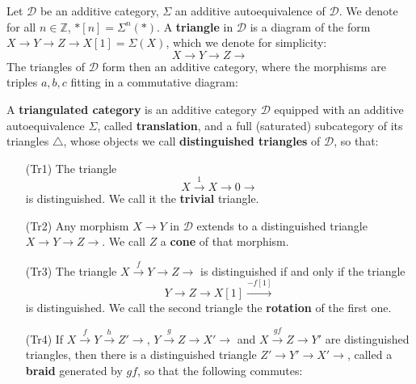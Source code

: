 \begin{defn}
Let $\mathscr{D}$ be an additive category, $\Sigma$ an additive autoequivalence of $\mathscr{D}$. We denote for all $n \in \mathbb{Z}$, $*[n]=\Sigma^n(*)$. A \textbf{triangle} in $\mathscr{D}$ is a diagram of the form $X \longrightarrow Y \longrightarrow Z \longrightarrow X[1]=\Sigma(X)$, which we denote for simplicity: $$X \longrightarrow Y \longrightarrow Z \longrightarrow$$
The triangles of $\mathscr{D}$ form then an additive category, where the morphisms are triples $a,b,c$ fitting in a commutative diagram: 
\begin{center}
\end{center}
A \textbf{triangulated category} is an additive category $\mathscr{D}$ equipped with an additive autoequivalence $\Sigma$, called \textbf{translation}, and a full (saturated) subcategory of its triangles $\bigtriangleup$, whose objects we call \textbf{distinguished triangles} of $\mathscr{D}$, so that: 
\begin{enumerate}
\item [(Tr1)] The triangle $$X \overset{1}{\longrightarrow} X \longrightarrow 0 \longrightarrow$$ is distinguished. We call it the \textbf{trivial} triangle.
\item [(Tr2)] Any morphism $X \longrightarrow Y$ in $\mathscr{D}$ extends to a distinguished triangle $X \longrightarrow Y \longrightarrow Z \longrightarrow $. We call $Z$ a \textbf{cone} of that morphism. 
\item [(Tr3)] The triangle $X \overset{f}{\longrightarrow} Y \longrightarrow Z \longrightarrow $ is distinguished if and only if the triangle $$Y \longrightarrow Z \longrightarrow  X[1]  \overset{-f[1]}{\longrightarrow} $$ is distinguished. We call the second triangle the \textbf{rotation} of the first one.
\item [(Tr4)] If  $X \overset{f}{\longrightarrow} Y \overset{h}{\longrightarrow} Z' \longrightarrow $, $Y \overset{g}{\longrightarrow} Z \longrightarrow X' \longrightarrow$ and $X \overset{gf}{\longrightarrow} Z \longrightarrow Y'$ are distinguished triangles, then there is a distinguished triangle $Z' \longrightarrow Y' \longrightarrow X' \longrightarrow $, called a \textbf{braid} generated by $gf$, so that the following commutes: \\

\end{enumerate}
\end{defn}
